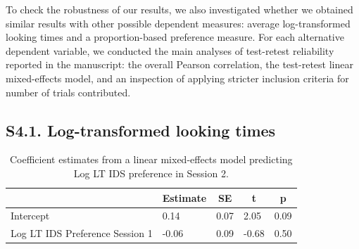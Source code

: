 \documentclass[
  man, donotrepeattitle,floatsintext]{apa6}
\begin{document}
To check the robustness of our results, we also investigated whether we obtained similar results with other possible dependent measures: average log-transformed looking times and a proportion-based preference measure. For each alternative dependent variable, we conducted the main analyses of test-retest reliability reported in the manuscript: the overall Pearson correlation, the test-retest linear mixed-effects model, and an inspection of applying stricter inclusion criteria for number of trials contributed.

\hypertarget{s4.1.-log-transformed-looking-times}{%
\subsection{S4.1. Log-transformed looking times}\label{s4.1.-log-transformed-looking-times}}

\begin{table}[tbp]

\begin{center}
\begin{threeparttable}

\caption{\label{tab:unnamed-chunk-7}Coefficient estimates from a linear mixed-effects model predicting Log LT IDS preference in Session 2.}

\begin{tabular}{lllll}
\toprule
 & \multicolumn{1}{c}{Estimate} & \multicolumn{1}{c}{SE} & \multicolumn{1}{c}{t} & \multicolumn{1}{c}{p}\\
\midrule
Intercept & 0.14 & 0.07 & 2.05 & 0.09\\
Log LT IDS Preference Session 1 & -0.06 & 0.09 & -0.68 & 0.50\\
\bottomrule
\end{tabular}

\end{threeparttable}
\end{center}

\end{table}
\end{document}
